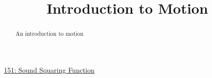 \documentclass{ximera}
\title{Introduction to Motion}
\begin{document}
\begin{abstract}
An introduction to motion
\end{abstract}
\maketitle

\begin{exploration} \label{Exp:54356773e32}

\begin{onlineOnly}
    \begin{center}
\end{center}
\end{onlineOnly}

\href{https://www.desmos.com/calculator/bk1z9cwbhb}{151: Sound Squaring Function}


\end{exploration}
\end{document}
